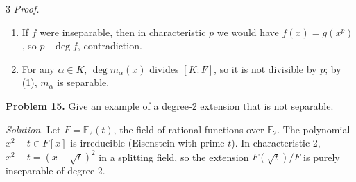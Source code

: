 \documentclass[10pt,landscape]{article}
\begin{document}
\begin{multicols}{3}
\textit{Proof.}
\begin{enumerate}
\item If \(f\) were inseparable, then in characteristic \(p\) we would have \(f(x)=g(x^p)\), so \(p\mid\deg f\), contradiction.
\item For any \(\alpha\in K\), \(\deg m_{\alpha}(x)\) divides \([K:F]\), so it is not divisible by \(p\); by (1), \(m_{\alpha}\) is separable. 
\end{enumerate}

\noindent\textbf{Problem 15.} Give an example of a degree‑2 extension that is not separable.

\textit{Solution.} Let \(F=\mathbb{F}_2(t)\), the field of rational functions over \(\mathbb{F}_2\). The polynomial \(x^2-t\in F[x]\) is irreducible (Eisenstein with prime \(t\)). In characteristic 2, \(x^2-t=(x-\sqrt{t})^2\) in a splitting field, so the extension \(F(\sqrt{t})/F\) is purely inseparable of degree 2.

\end{multicols}
\end{document}

